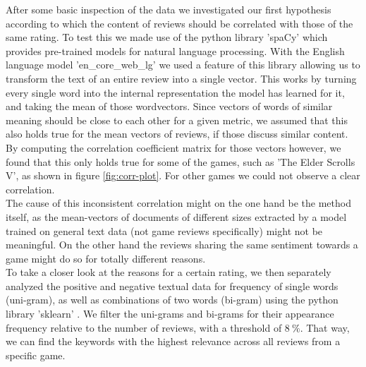 \documentclass{article}
\theoremstyle{plain}
\theoremstyle{definition}
\theoremstyle{remark}
\begin{document}
After some basic inspection of the data we investigated our first hypothesis according to which the content of reviews should be correlated with those of the same rating. To test this we made use of the python library 'spaCy' \cite{spacy} which provides pre-trained models for natural language processing. With the English language model 'en\_core\_web\_lg' we used a feature of this library allowing us to transform the text of an entire review into a single vector. This works by turning every single word into the internal representation the model has learned for it, and taking the mean of those wordvectors. Since vectors of words of similar meaning should be close to each other for a given metric, we assumed that this also holds true for the mean vectors of reviews, if those discuss similar content. By computing the  correlation coefficient matrix for those vectors however, we found that this only holds true for some of the games, such as 'The Elder Scrolls V', as shown in figure \ref{fig:corr-plot}. For other games we could not observe a clear correlation.\\ 
The cause of this inconsistent correlation might on the one hand be the method itself, as the mean-vectors of documents of different sizes extracted by a model trained on general text data (not game reviews specifically) might not be meaningful. On the other hand the reviews sharing the same sentiment towards a game might do so for totally different reasons.\\
To take a closer look at the reasons for a certain rating, we then separately analyzed the positive and negative textual data for frequency of single words (uni-gram), as well as combinations of two words (bi-gram) using the python library 'sklearn' \cite{Scikit}. We filter the uni-grams and bi-grams for their appearance frequency relative to the number of reviews, with a threshold of $8 \ \%$. That way, we can find the keywords with the highest relevance across all reviews from a specific game.\\%

\end{document}
